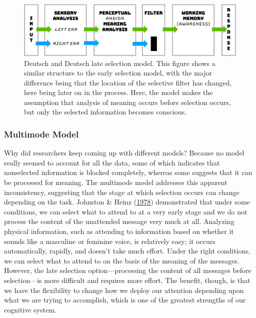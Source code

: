 \documentclass[
]{krantz}
\begin{document}
\begin{figure}

{\centering \includegraphics[width=0.8\linewidth]{images/ch3/fig5} 

}

\caption{Deutsch and Deutsch late selection model. This figure shows a similar structure to the early selection model, with the major difference being that the location of the selective filter has changed, here being later on in the process. Here, the model makes the assumption that analysis of meaning occurs before selection occurs, but only the selected information becomes conscious.}\label{fig:lateselection}
\end{figure}

\hypertarget{multimode-model}{%
\subsubsection*{Multimode Model}\label{multimode-model}}


Why did researchers keep coming up with different models? Because no model really seemed to account for all the data, some of which indicates that nonselected information is blocked completely, whereas some suggests that it can be processed for meaning. The multimode model addresses this apparent inconsistency, suggesting that the stage at which selection occurs can change depending on the task. Johnston \& Heinz (\protect\hyperlink{ref-Johnston1978}{1978}) demonstrated that under some conditions, we can select what to attend to at a very early stage and we do not process the content of the unattended message very much at all. Analyzing physical information, such as attending to information based on whether it sounds like a masculine or feminine voice, is relatively easy; it occurs automatically, rapidly, and doesn't take much effort. Under the right conditions, we can select what to attend to on the basis of the meaning of the messages. However, the late selection option---processing the content of all messages before selection---is more difficult and requires more effort. The benefit, though, is that we have the flexibility to change how we deploy our attention depending upon what we are trying to accomplish, which is one of the greatest strengths of our cognitive system.
\end{document}
